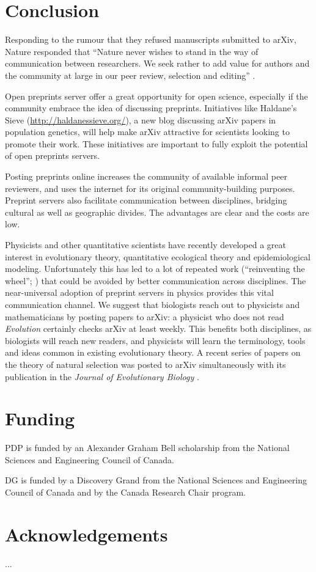 \documentclass[letterpaper,twocolumn,superscriptaddress,showkeys]{revtex4-1}
\begin{document}
\section{Conclusion}

Responding to the rumour that they refused manuscripts submitted to arXiv,
Nature responded that ``Nature never wishes to stand in the way of communication
between researchers. We seek rather to add value for authors and the community
at large in our peer review, selection and editing'' \cite{nat05}.

Open preprints server offer a great opportunity for open science, especially if
the community embrace the idea of discussing preprints. Initiatives like
Haldane's Sieve (\href{http://haldanessieve.org/}{http://haldanessieve.org/}), a
new blog discussing arXiv papers in population genetics, will help make arXiv
attractive for scientists looking to promote their work. These initiatives are
important to fully exploit the potential of open preprints servers.

Posting preprints online increases the community of available informal peer
reviewers, and uses the internet for its original community-building purposes.
Preprint servers also facilitate communication between disciplines, bridging
cultural as well as geographic divides. The advantages are clear and the costs
are low.

Physicists and other quantitative scientists have recently developed a great
interest in evolutionary theory, quantitative ecological theory and
epidemiological modeling.  Unfortunately this has led to a lot of repeated work
(``reinventing the wheel''; \cite{de2011contribution}) that could be avoided by
better communication across disciplines.  The near-universal adoption of
preprint servers in physics provides this vital communication channel.  We
suggest that biologists reach out to physicists and mathematicians by posting
papers to arXiv: a physicist who does not read \emph{Evolution} certainly checks
arXiv at least weekly.  This benefits both disciplines, as biologists will reach
new readers, and physicists will learn the terminology, tools and ideas common
in existing evolutionary theory.  A recent series of papers on the theory of
natural selection was posted to arXiv simultaneously with its publication in the
\emph{Journal of Evolutionary Biology}
\cite{JEB:JEB2431,JEB:JEB2498,JEB:JEB2378,JEB:JEB2373}.

\section{Funding}

PDP is funded by an Alexander Graham Bell scholarship from the National Sciences
and Engineering Council of Canada.

DG is funded by a Discovery Grand from the National Sciences and Engineering
Council of Canada and by the Canada Research Chair program.

\section{Acknowledgements}

...

\newpage


\end{document}
